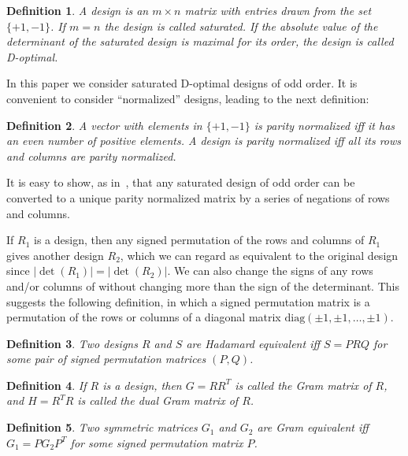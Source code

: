 \documentclass[11pt,a4paper]{article}
\newtheorem{definition}{Definition}
\newcommand{\diag}{\mathrm{diag}}
\begin{document}
\begin{definition}\label{def:design} 
A \emph{design} is an $m \times n$ matrix with entries drawn from the set
$\{+1, -1\}$.  If $m=n$ the design is called \emph{saturated}.  If the
absolute value of the 
determinant of the saturated design is maximal for its order, the design is
called \emph{D-optimal}.
\end{definition}

In this paper we consider saturated D-optimal designs of odd order.  It is
convenient to consider ``normalized'' designs, leading to the next
definition:

\begin{definition}
A vector with elements
in $\{+1,-1\}$ is {\em parity normalized} iff it has an even number of
positive elements. A design is {\em parity normalized}
iff all its rows and columns are parity normalized.  
\end{definition}

It is easy to show, as
in~\cite[Lemmas 3.1, 3.2]{Ehlich64a}, that any saturated design of odd
order can be converted to a unique parity normalized matrix by a series of
negations of rows and columns.

If $R_1$ is a design, then any signed permutation of the rows and columns
of $R_1$ gives another design $R_2$, which we can regard as equivalent to the
original design since $|\det(R_1)| = |\det(R_2)|$.
We can also change the signs of any rows and/or
columns of without changing more than the sign of the determinant.
This suggests the following definition, in which a signed permutation matrix 
is a permutation of the rows or columns of a diagonal matrix 
$\diag(\pm 1, \pm 1, \ldots, \pm 1)$.

\begin{definition} \label{def:Hequiv}
Two designs $R$ and $S$ are {\em Hadamard equivalent}
iff $S = PRQ$ for some pair of signed permutation matrices $(P,Q)$.
\end{definition}

\begin{definition} \label{def:gram} 
If $R$ is a design, then
$G=RR^T$ is called the \emph{Gram matrix} of $R$,
and $H = R^TR$ is called the \emph{dual Gram matrix} of $R$.
\end{definition}

\begin{definition}
Two symmetric matrices $G_1$ and $G_2$ are 
{\em Gram equivalent}
iff $G_1 = PG_2 P^T$ for some signed
permutation matrix $P$.
\end{definition}
\end{document}
